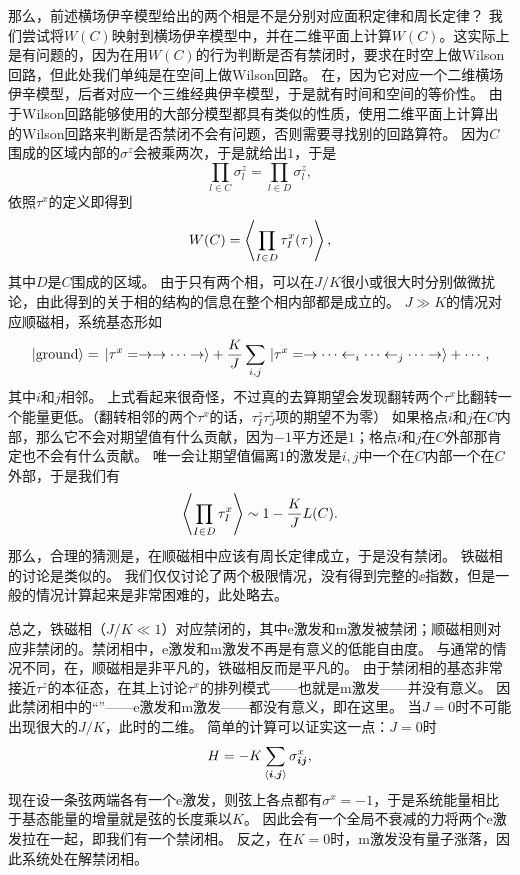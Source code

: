那么，前述横场伊辛模型给出的两个相是不是分别对应面积定律和周长定律？
我们尝试将$W(C)$映射到横场伊辛模型中，并在二维平面上计算$W(C)$。这实际上是有问题的，因为在用$W(C)$的行为判断是否有禁闭时，要求在时空上做Wilson回路，但此处我们单纯是在空间上做Wilson回路。
在，因为它对应一个二维横场伊辛模型，后者对应一个三维经典伊辛模型，于是就有时间和空间的等价性。
由于Wilson回路能够使用的大部分模型都具有类似的性质，使用二维平面上计算出的Wilson回路来判断是否禁闭不会有问题，否则需要寻找别的回路算符。
因为$C$围成的区域内部的$\sigma^z$会被乘两次，于是就给出$1$，于是
\[
    \prod_{l \in C} \sigma^z_l = \prod_{l \in D} \sigma^z_l,
\]
依照$\tau^x$的定义即得到
\begin{equation}
    W(C) = \expval{\prod_{I \in D} \tau^x_I(\tau)},
\end{equation}
其中$D$是$C$围成的区域。
由于只有两个相，可以在$J/K$很小或很大时分别做微扰论，由此得到的关于相的结构的信息在整个相内部都是成立的。
$J \gg K$的情况对应顺磁相，系统基态形如
\[
    \ket*{\text{ground}} = \ket*{\tau^x = \rightarrow \rightarrow \cdots \rightarrow} + \frac{K}{J} \sum_{i, j} \ket*{\tau^x = \rightarrow \cdots \leftarrow_i \cdots \leftarrow_j \cdots \rightarrow} + \cdots,
\]
其中$i$和$j$相邻。
上式看起来很奇怪，不过真的去算期望会发现翻转两个$\tau^x$比翻转一个能量更低。（翻转相邻的两个${\tau}^x$的话，${\tau}^z_I {\tau}^z_J$项的期望不为零）
如果格点$i$和$j$在$C$内部，那么它不会对期望值有什么贡献，因为$-1$平方还是$1$；格点$i$和$j$在$C$外部那肯定也不会有什么贡献。
唯一会让期望值偏离$1$的激发是$i, j$中一个在$C$内部一个在$C$外部，于是我们有
\[
    \expval{\prod_{I \in D} {\tau}^x_I} \sim 1 - \frac{K}{J} L(C).
\]
那么，合理的猜测是，在顺磁相中应该有周长定律成立，于是没有禁闭。
铁磁相的讨论是类似的。 %
我们仅仅讨论了两个极限情况，没有得到完整的$\ee$指数，但是一般的情况计算起来是非常困难的，此处略去。

总之，铁磁相（$J / K \ll 1$）对应禁闭的，其中e激发和m激发被禁闭；顺磁相则对应非禁闭的。禁闭相中，e激发和m激发不再是有意义的低能自由度。
与通常的情况不同，在，顺磁相是非平凡的，铁磁相反而是平凡的。
由于禁闭相的基态非常接近${\tau}^z$的本征态，在其上讨论${\tau}^x$的排列模式——也就是m激发——并没有意义。
因此禁闭相中的“”——e激发和m激发——都没有意义，即在这里。
当$J=0$时不可能出现很大的$J/K$，此时的二维。
简单的计算可以证实这一点：$J=0$时
\[
    H = - K \sum_{\langle \vb*{i}, \vb*{j} \rangle} \sigma^x_{\vb*{i} \vb*{j}},
\]
现在设一条弦两端各有一个e激发，则弦上各点都有$\sigma^x = -1$，于是系统能量相比于基态能量的增量就是弦的长度乘以$K$。
因此会有一个全局不衰减的力将两个e激发拉在一起，即我们有一个禁闭相。
反之，在$K=0$时，m激发没有量子涨落，因此系统处在解禁闭相。

